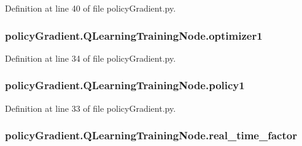 Definition at line 40 of file policy\+Gradient.\+py.

\subsubsection[{\texorpdfstring{optimizer1}{optimizer1}}]{\setlength{\rightskip}{0pt plus 5cm}policy\+Gradient.\+Q\+Learning\+Training\+Node.\+optimizer1}\hypertarget{classpolicy_gradient_1_1_q_learning_training_node_ac20060dc24d869ed2f9922c2b4126f19}{}\label{classpolicy_gradient_1_1_q_learning_training_node_ac20060dc24d869ed2f9922c2b4126f19}


Definition at line 34 of file policy\+Gradient.\+py.

\subsubsection[{\texorpdfstring{policy1}{policy1}}]{\setlength{\rightskip}{0pt plus 5cm}policy\+Gradient.\+Q\+Learning\+Training\+Node.\+policy1}\hypertarget{classpolicy_gradient_1_1_q_learning_training_node_a37c369f5ac5458dbbc0e4e6946fb3171}{}\label{classpolicy_gradient_1_1_q_learning_training_node_a37c369f5ac5458dbbc0e4e6946fb3171}


Definition at line 33 of file policy\+Gradient.\+py.

\subsubsection[{\texorpdfstring{real\+\_\+time\+\_\+factor}{real_time_factor}}]{\setlength{\rightskip}{0pt plus 5cm}policy\+Gradient.\+Q\+Learning\+Training\+Node.\+real\+\_\+time\+\_\+factor}\hypertarget{classpolicy_gradient_1_1_q_learning_training_node_a045066b899a5d654fd9473cb86b07462}{}\label{classpolicy_gradient_1_1_q_learning_training_node_a045066b899a5d654fd9473cb86b07462}


